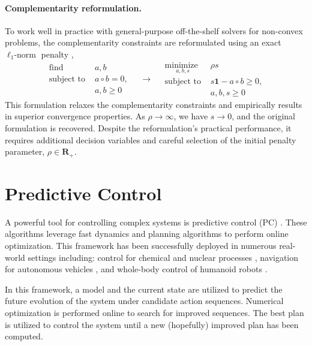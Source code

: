 \paragraph{Complementarity reformulation.} To work well in practice with general-purpose off-the-shelf solvers for non-convex problems, the complementarity constraints are reformulated using an exact $\ell_1\mbox{-norm}$ penalty \cite{manchester2020variational},
\begin{equation}
	\begin{array}{ll}
		\underset{}{\mbox{find }}  & a, b\\
		\mbox{subject to } & a \circ b = 0, \\ 
		& a, b \geq 0
	\end{array}
	\quad
	\rightarrow 
	\quad
	\begin{array}{ll}
		\underset{a, b, s}{\mbox{minimize }}  & \rho s\\
		\mbox{subject to } & s \mathbf{1} - a \circ b \geq 0, \\
		& a, b, s \geq 0
	\end{array} \label{intro_complementarity_reformulation}
\end{equation}
This formulation relaxes the complementarity constraints and empirically results in superior convergence properties. As $\rho \rightarrow \infty$, we have $s \rightarrow 0$, and the original formulation is recovered. Despite the reformulation's practical performance, it requires additional decision variables and careful selection of the initial penalty parameter, $\rho \in \mathbf{R}_+$.

\section{Predictive Control}
A powerful tool for controlling complex systems is predictive control (PC) \cite{richalet1978model}. These algorithms leverage fast dynamics and planning algorithms to perform online optimization. This framework has been successfully deployed in numerous real-world settings including: control for chemical and nuclear processes \cite{na2003model, lopez2013fast}, navigation for autonomous vehicles \cite{falcone2007predictive}, and whole-body control of humanoid robots \cite{atlas2019parkour}.

In this framework, a model and the current state are utilized to predict the future evolution of the system under candidate action sequences. Numerical optimization is performed online to search for improved sequences. The best plan is utilized to control the system until a new (hopefully) improved plan has been computed.

